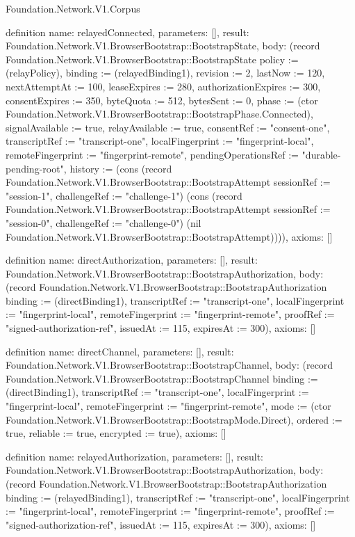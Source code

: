 \begin{lexlean}{Foundation.Network.V1.Corpus}
\begin{semanticmodule}
definition{
  name: relayedConnected,
  parameters: [],
  result: Foundation.Network.V1.BrowserBootstrap::BootstrapState,
  body: (record Foundation.Network.V1.BrowserBootstrap::BootstrapState {policy := (relayPolicy), binding := (relayedBinding1), revision := 2, lastNow := 120, nextAttemptAt := 100, leaseExpires := 280, authorizationExpires := 300, consentExpires := 350, byteQuota := 512, bytesSent := 0, phase := (ctor Foundation.Network.V1.BrowserBootstrap::BootstrapPhase.Connected), signalAvailable := true, relayAvailable := true, consentRef := "consent-one", transcriptRef := "transcript-one", localFingerprint := "fingerprint-local", remoteFingerprint := "fingerprint-remote", pendingOperationsRef := "durable-pending-root", history := (cons (record Foundation.Network.V1.BrowserBootstrap::BootstrapAttempt {sessionRef := "session-1", challengeRef := "challenge-1"}) (cons (record Foundation.Network.V1.BrowserBootstrap::BootstrapAttempt {sessionRef := "session-0", challengeRef := "challenge-0"}) (nil Foundation.Network.V1.BrowserBootstrap::BootstrapAttempt)))}),
  axioms: []
}

definition{
  name: directAuthorization,
  parameters: [],
  result: Foundation.Network.V1.BrowserBootstrap::BootstrapAuthorization,
  body: (record Foundation.Network.V1.BrowserBootstrap::BootstrapAuthorization {binding := (directBinding1), transcriptRef := "transcript-one", localFingerprint := "fingerprint-local", remoteFingerprint := "fingerprint-remote", proofRef := "signed-authorization-ref", issuedAt := 115, expiresAt := 300}),
  axioms: []
}

definition{
  name: directChannel,
  parameters: [],
  result: Foundation.Network.V1.BrowserBootstrap::BootstrapChannel,
  body: (record Foundation.Network.V1.BrowserBootstrap::BootstrapChannel {binding := (directBinding1), transcriptRef := "transcript-one", localFingerprint := "fingerprint-local", remoteFingerprint := "fingerprint-remote", mode := (ctor Foundation.Network.V1.BrowserBootstrap::BootstrapMode.Direct), ordered := true, reliable := true, encrypted := true}),
  axioms: []
}

definition{
  name: relayedAuthorization,
  parameters: [],
  result: Foundation.Network.V1.BrowserBootstrap::BootstrapAuthorization,
  body: (record Foundation.Network.V1.BrowserBootstrap::BootstrapAuthorization {binding := (relayedBinding1), transcriptRef := "transcript-one", localFingerprint := "fingerprint-local", remoteFingerprint := "fingerprint-remote", proofRef := "signed-authorization-ref", issuedAt := 115, expiresAt := 300}),
  axioms: []
}


\end{semanticmodule}
\end{lexlean}
